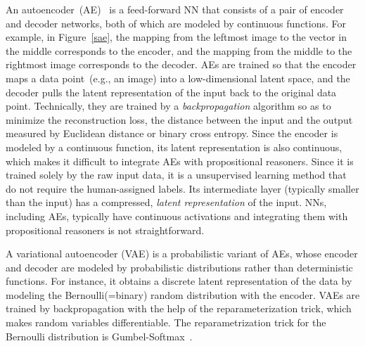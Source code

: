 An autoencoder~(AE)~\cite{hinton2006reducing} is a feed-forward NN that consists of a pair of encoder and decoder networks, both of which are modeled by continuous functions.
For example, in Figure~\ref{sae}, the mapping from the leftmost image to the vector in the middle corresponds to the encoder, and the mapping from the middle to the rightmost image corresponds to the decoder.
AEs are trained so that the encoder maps a data point~(e.g., an image) into a low-dimensional latent space, and the decoder pulls the latent representation of the input back to the original data point.
Technically, they are trained by a \emph{backpropagation} algorithm so as to minimize the reconstruction loss, the distance between the input and the output measured by Euclidean distance or binary cross entropy.
Since the encoder is modeled by a continuous function, its latent representation is also continuous, which makes it difficult to integrate AEs with propositional reasoners.
Since it is trained solely by the raw input data, it is a unsupervised learning method that do not require the human-assigned labels.
Its intermediate layer (typically smaller than the input) has a compressed, \emph{latent representation} of the input.
NNs, including AEs, typically have continuous activations and integrating them with propositional reasoners is not straightforward.
\fi

A variational autoencoder (VAE) \cite{kingma2013auto} is a probabilistic variant of AEs, whose encoder and decoder are modeled by probabilistic distributions rather than deterministic functions.
For instance,
it obtains a discrete latent representation of the data by modeling the Bernoulli(=binary) random distribution with the encoder.
VAEs are trained by backpropagation with the help of the reparameterization trick, which makes random variables differentiable.
The reparametrization trick for the Bernoulli distribution is Gumbel-Softmax~\cite{jang2016categorical}.


